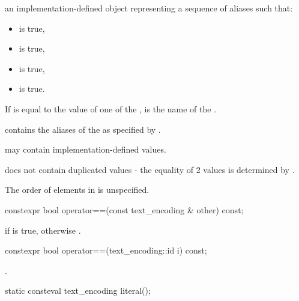 \documentclass{wg21}
\begin{document}
\begin{addedblock}
\begin{itemdescr}
\returns an implementation-defined object  representing a sequence of aliases such that:
\begin{itemize}
    \item {} is true,
    \item {} is true,
    \item {} is true,
    \item {} is true.
\end{itemize}

\pnum If  is equal to the  value of one of the ,  is the name of the .

 contains the aliases of the  as specified by \cite{rfc2978}.

\pnum {} may contain implementation-defined values.

\pnum {} does not contain duplicated values - the equality of 2 values is determined by .

\begin{note}
The order of elements in  is unspecified.
\end{note}

\end{itemdescr}

\begin{itemdecl}
constexpr bool operator==(const text_encoding & other) const;
\end{itemdecl}

\begin{itemdescr}
\returns
{} if  is true, 
otherwise
.
\end{itemdescr}

\begin{itemdecl}
constexpr bool operator==(text_encoding::id i) const;
\end{itemdecl}

\begin{itemdescr}
\returns {}.
\end{itemdescr}

\begin{itemdecl}
static consteval text_encoding literal();
\end{itemdecl}


\end{addedblock}
\end{document}
